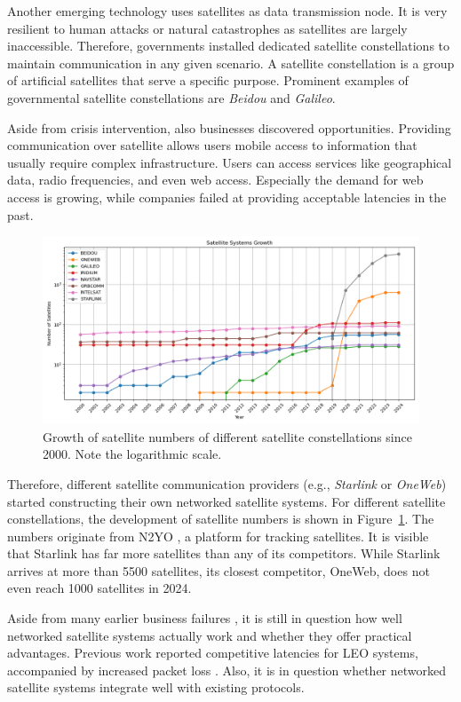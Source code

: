 Another emerging technology uses satellites as data transmission node. It is very resilient to human attacks or natural catastrophes as satellites are largely inaccessible. Therefore, governments installed dedicated satellite constellations to maintain communication in any given scenario. A satellite constellation is a group of artificial satellites that serve a specific purpose. Prominent examples of governmental satellite constellations are \textit{Beidou} and \textit{Galileo}.

Aside from crisis intervention, also businesses discovered opportunities. Providing communication over satellite allows users mobile access to information that usually require complex infrastructure. Users can access services like geographical data, radio frequencies, and even web access.
Especially the demand for web access is growing, while companies failed at providing acceptable latencies in the past.

\begin{figure}
	\label{fig:satellitegrowth}
	\centering
	\includegraphics[width=\textwidth]{./chapters/img/satellite-growth.png}
	\caption{Growth of satellite numbers of different satellite constellations since 2000. Note the logarithmic scale.}
\end{figure}

Therefore, different satellite communication providers (e.g., \textit{Starlink} or \textit{OneWeb}) started constructing their own networked satellite systems.
For different satellite constellations, the development of satellite numbers is shown in Figure~\ref{fig:satellitegrowth}. The numbers originate from N2YO \cite{N2YO2024}, a platform for tracking satellites.
It is visible that Starlink has far more satellites than any of its competitors. While Starlink arrives at more than 5500 satellites, its closest competitor, OneWeb, does not even reach 1000 satellites in 2024.

Aside from many earlier business failures \cite{Chan2002, Barboza2000}, it is still in question how well networked satellite systems actually work and whether they offer practical advantages. Previous work reported competitive latencies for \ac{LEO} systems, accompanied by increased packet loss \cite{DBLP:conf/imc/MichelTGB22}.
Also, it is in question whether networked satellite systems integrate well with existing protocols.

